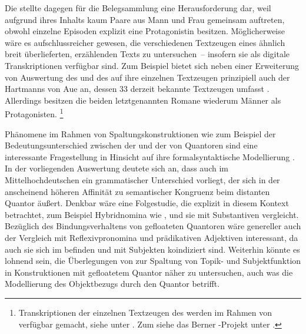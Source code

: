 Die \KC{} stellte dagegen für die Belegsammlung eine Herausforderung dar, weil
aufgrund ihres Inhalts kaum Paare aus Mann und Frau gemeinsam auftreten, obwohl
einzelne Episoden explizit eine Protagonistin besitzen. Möglicherweise wäre es
aufschlussreicher gewesen, die verschiedenen Textzeugen eines ähnlich breit
überlieferten, erzählenden Texts zu untersuchen~-- insofern sie als digitale
Transkriptionen verfügbar sind. Zum Beispiel bietet sich
neben einer Erweiterung von  Auswertung des
 und des  auf ihre einzelnen Textzeugen prinzipiell
auch der  Hartmanns von Aue an, dessen  33
derzeit bekannte Textzeugen umfasst \autocites[vgl.][s.\,v.~\textit{Hartmann
von Aue: }]{hsc}. Allerdings besitzen die beiden letztgenannten
Romane wiederum Männer als Protagonisten.%
%
	\footnote{Transkriptionen der einzelnen Textzeugen des
		 werden im Rahmen von  verfügbar
		gemacht, siehe unter . Zum  siehe das
		Berner -Projekt unter .%
	}

Phänomene im Rahmen von Spaltungskonstruktionen wie zum Beispiel der
Bedeutungs\-unterschied zwischen der  und der
 von Quantoren sind eine interessante Fragestellung in
Hinsicht auf ihre formal\-syntaktische Modellierung \parencite[siehe
z.\,B.][]{pittner1995,merchant1996,fanselowcavar2002,nolda2007,shen2019}. In
der vorliegenden Auswertung deutete sich an, dass auch im
Mittelhochdeutschen ein grammatischer Unterschied
vorliegt, der sich in der anscheinend höheren Affinität zu semantischer
Kongruenz beim distanten Quantor äußert. Denkbar wäre eine Folgestudie, die
explizit   in diesem Kontext
betrachtet, zum Beispiel Hybridnomina wie 
, und sie mit 
Substantiven vergleicht. Bezüglich des
Bindungsverhaltens von gefloateten Quantoren
wäre genereller auch der Vergleich mit Reflexivpronomina
und prädikativen Adjektiven interessant, da auch sie
sich im  befinden und mit Subjekten
koindiziert sind. Weiterhin könnte es lohnend sein, die
Überlegungen von \citet{spector2009} zur Spaltung von Topik- und
Subjektfunktion in Konstruktionen mit gefloatetem Quantor näher zu
untersuchen, auch was die Modellierung des Objektbezugs durch den Quantor
betrifft.

